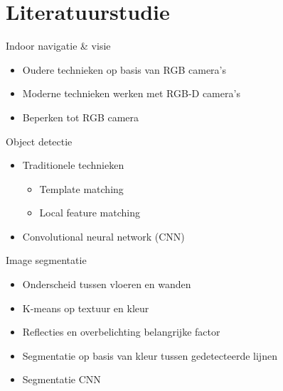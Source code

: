 \documentclass[11pt,t]{beamer}
\begin{document}
 \section{Literatuurstudie}
 \begin{frame}[fragile]{Indoor navigatie & visie}
	\begin{itemize}
		\item Oudere technieken op basis van RGB camera's
		\item Moderne technieken werken met RGB-D camera's
		\item Beperken tot RGB camera
	\end{itemize}
 \end{frame}

 \begin{frame}[fragile]{Object detectie}
	\begin{itemize}
		\item Traditionele technieken
		\begin{itemize}
			\item Template matching
			\item Local feature matching
		\end{itemize}
		\item Convolutional neural network (CNN)
	\end{itemize}
 \end{frame}


 \begin{frame}[fragile]{Image segmentatie}
	\begin{itemize}
		\item Onderscheid tussen vloeren en wanden
		\item K-means op textuur en kleur
		\item Reflecties en overbelichting belangrijke factor
		\item Segmentatie op basis van kleur tussen gedetecteerde lijnen
		\item Segmentatie CNN
	\end{itemize}
 \end{frame}



\end{document}
